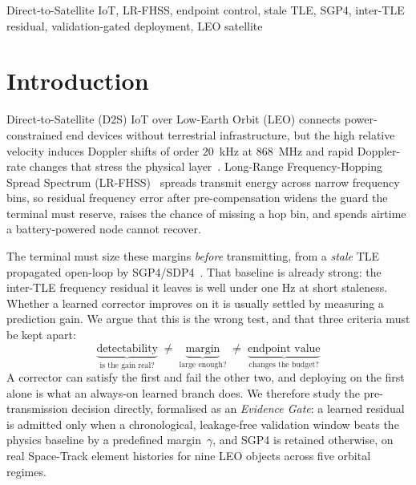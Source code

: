 \documentclass[conference]{IEEEtran}
\begin{document}
\begin{IEEEkeywords}
Direct-to-Satellite IoT, LR-FHSS, endpoint control, stale TLE, SGP4, inter-TLE
residual, validation-gated deployment, LEO satellite
\end{IEEEkeywords}

\section{Introduction}
\label{sec:intro}

Direct-to-Satellite (D2S) IoT over Low-Earth Orbit (LEO) connects
power-constrained end devices without terrestrial infrastructure, but the high
relative velocity induces Doppler shifts of order $20$~kHz at 868~MHz and rapid
Doppler-rate changes that stress the physical layer~\cite{hurn2023lrfhss}.
Long-Range Frequency-Hopping Spread Spectrum
(LR-FHSS)~\cite{semtech2023lrfhss} spreads transmit energy across narrow
frequency bins, so residual frequency error after pre-compensation widens the
guard the terminal must reserve, raises the chance of missing a hop bin, and
spends airtime a battery-powered node cannot recover.

The terminal must size these margins \emph{before} transmitting, from a
\emph{stale} TLE propagated open-loop by SGP4/SDP4~\cite{hoots1980models}. That
baseline is already strong: the inter-TLE frequency residual it leaves is well
under one Hz at short staleness. Whether a learned corrector improves on it is
usually settled by measuring a prediction gain. We argue that this is the wrong
test, and that three criteria must be kept apart:
\begin{equation}
\underbrace{\text{detectability}}_{\text{is the gain real?}}
\;\neq\;
\underbrace{\text{margin}}_{\text{large enough?}}
\;\neq\;
\underbrace{\text{endpoint value}}_{\text{changes the budget?}}
\label{eq:axes}
\end{equation}
A corrector can satisfy the first and fail the other two, and deploying on the
first alone is what an always-on learned branch does. We therefore study the
pre-transmission decision directly, formalised as an \emph{Evidence Gate}: a
learned residual is admitted only when a chronological, leakage-free validation
window beats the physics baseline by a predefined margin~$\gamma$, and SGP4 is
retained otherwise, on real Space-Track element histories for nine LEO objects
across five orbital regimes.
\end{document}
